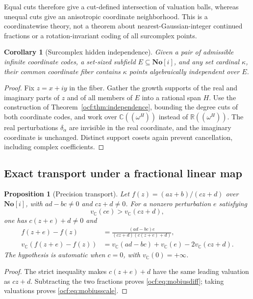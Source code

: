 \documentclass[11pt,a4paper]{article}
\numberwithin{equation}{section}
\newtheorem{proposition}[theorem]{Proposition}
\newtheorem{corollary}[theorem]{Corollary}
\theoremstyle{definition}
\theoremstyle{remark}
\newcommand{\SC}{\mathbf{No}[i]}
\newcommand{\R}{\mathbb R}
\newcommand{\C}{\mathbb C}
\begin{document}
Equal cuts therefore give a cut-defined intersection of valuation balls,
whereas unequal cuts give an anisotropic coordinate neighborhood. This is a coordinatewise theory,
not a theorem about nearest-Gaussian-integer continued fractions or a
rotation-invariant coding of all surcomplex points.

\begin{corollary}[Surcomplex hidden independence]\label{ocf:cor:complexindependence}
Given a pair of admissible infinite coordinate codes, a set-sized
subfield $E\subseteq\SC$, and any set cardinal $\kappa$, their common
coordinate fiber contains $\kappa$ points algebraically independent over
$E$.
\end{corollary}
\begin{proof}
Fix $z=x+iy$ in the fiber. Gather the growth supports of the real and
imaginary parts of $z$ and of all members of $E$ into a rational span $H$.
Use the construction of Theorem~\ref{ocf:thm:independence}, bounding the degree
cuts of both coordinate codes, and work over $\C((\omega^H))$ instead of
$\R((\omega^H))$. The real perturbations $\delta_\alpha$ are invisible in
the real coordinate, and the imaginary coordinate is unchanged. Distinct
support cosets again prevent cancellation, including complex coefficients.
\end{proof}

\subsection{Exact transport under a fractional linear map}

\begin{proposition}[Precision transport]\label{ocf:prop:mobius}
Let $f(z)=(az+b)/(cz+d)$ over $\SC$, with $ad-bc\ne0$ and $cz+d\ne0$.
For a nonzero perturbation $e$ satisfying
\begin{equation}\label{ocf:eq:smalltransport}
 v_\C(ce)>v_\C(cz+d),
\end{equation}
one has $c(z+e)+d\ne0$ and
\begin{align}
 f(z+e)-f(z)
   &=\frac{(ad-bc)e}{(cz+d)(c(z+e)+d)},\label{ocf:eq:mobiusdiff}\\
 v_\C(f(z+e)-f(z))
   &=v_\C(ad-bc)+v_\C(e)-2v_\C(cz+d).\label{ocf:eq:mobiusscale}
\end{align}
The hypothesis is automatic when $c=0$, with $v_\C(0)=+\infty$.
\end{proposition}
\begin{proof}
The strict inequality makes $c(z+e)+d$ have the same leading valuation as
$cz+d$. Subtracting the two fractions proves \eqref{ocf:eq:mobiusdiff}; taking
valuations proves \eqref{ocf:eq:mobiusscale}.
\end{proof}
\end{document}
